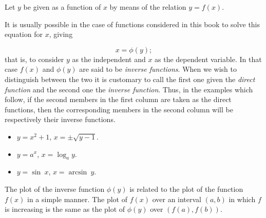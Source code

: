 Let $y$ be given as a function of $x$ by means of the relation $y = f(x)$.

It is usually possible in the case of functions considered in this book 
to solve this equation for $x$, giving

\[
    x = \phi (y);
\]
that is, to consider $y$ as the independent and $x$ as the dependent variable. 
In that case $f(x)$ and $\phi (y)$ are said to be {\it inverse functions}. 
When we wish to distinguish between the two it is customary to call the 
first one given the {\it direct function} and the second one the 
{\it inverse function}. Thus, in the examples which follow, if the 
second members in the first column are taken as the direct functions, 
then the corresponding members in the second column will be 
respectively their inverse functions.

\begin{example}
{\rm
\begin{itemize}
\item   
$y=x^2 + 1$, 	$x = \pm \sqrt{y - 1}$.
\item
 $y = a^x$, 	$x = \log_a y$.

\item
$ y = \sin\ x$, $x = \arcsin\ y$.
\end{itemize}
}
\end{example}

The plot of the inverse function $\phi(y)$ is related to the 
plot of the function
$f(x)$ in a simple manner. The plot of $f(x)$ over an interval 
$(a,b)$ in which $f$ is 
increasing is the same as the plot of $\phi(y)$ over $(f(a),f(b))$. 

